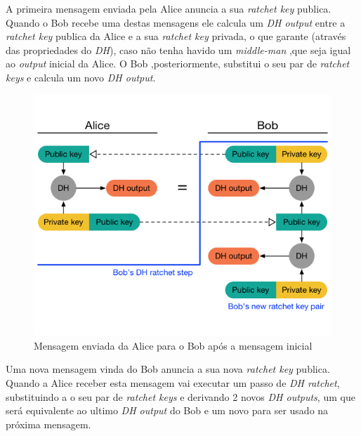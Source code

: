 A primeira mensagem enviada pela Alice anuncia a sua \textit{ratchet key} publica. Quando o Bob recebe uma destas mensagens ele calcula um \textit{DH output} entre a \textit{ratchet key} publica da Alice e a sua \textit{ratchet key} privada, o que garante (através das propriedades do \textit{DH}), caso não tenha havido um \textit{middle-man} ,que seja igual ao \textit{output} inicial da Alice. O Bob ,posteriormente, substitui o seu par de \textit{ratchet keys} e calcula um novo \textit{DH output}.

\begin{figure}[H]
\begin{center}
\includegraphics[width=12cm]{img/DH2.png}
\caption{Mensagem enviada da Alice para o Bob após a mensagem inicial }
\label{diagram:DH2}
\centering
\end{center}
\end{figure}

Uma nova mensagem vinda do Bob anuncia a sua nova \textit{ratchet key} publica. Quando a Alice receber esta mensagem vai executar um passo de \textit{DH ratchet}, substituindo a o seu par de \textit{ratchet keys} e derivando 2 novos \textit{DH outputs}, um que será equivalente ao ultimo \textit{DH output} do Bob e um novo para ser usado na próxima mensagem.

